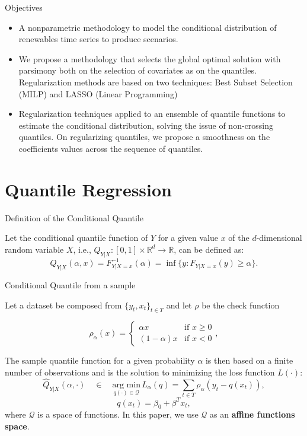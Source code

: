 \begin{frame}{Objectives}

\begin{itemize}
    \item A nonparametric methodology to model the conditional distribution of renewables time series to produce scenarios.
    
    \item We propose a methodology that selects the global optimal solution with parsimony both on the selection of covariates as on the quantiles. Regularization methods are based on two techniques: Best Subset Selection (MILP) and LASSO (Linear Programming) 
    
    \item Regularization techniques applied to an ensemble of quantile functions to estimate the conditional distribution, solving the issue of non-crossing quantiles. On regularizing quantiles, we propose a smoothness on the coefficients values across the sequence of quantiles. 

\end{itemize}

\end{frame}

\section{Quantile Regression}\label{quantile-regression}

\begin{frame}{Definition of the Conditional Quantile}

Let the conditional quantile function of \(Y\) for a given value \(x\)
of the \(d\)-dimensional random variable \(X\), i.e.,
\(Q_{Y|X}:[0,1] \times \mathbb{R}^d \rightarrow \mathbb{R}\), can be
defined as:
\[Q_{Y|X}(\alpha,x) = F_{Y|X=x}^{-1}(\alpha) = \inf\{y: F_{Y|X=x}(y) \geq \alpha\}.\]

\end{frame}

\begin{frame}{Conditional Quantile from a sample}

Let a dataset be composed from \(\{y_t,x_t \}_{t \in T}\) and let
\(\rho\) be the check function

\begin{equation}\label{eq:check-function}
\rho_{\alpha}(x)=\begin{cases}
\alpha x & \text{if }x\geq0\\
(1-\alpha)x & \text{if }x<0
\end{cases},
\end{equation}

The sample quantile function for a given probability \(\alpha\) is then
based on a finite number of observations and is the solution to
minimizing the loss function \(L(\cdot)\): \[
\hat{Q}_{Y|X}(\alpha,\cdot)\quad\in\quad  \underset{q(\cdot)\in\mathcal{Q}}{\text{arg min}}\, L_\alpha(q) = \sum_{t\in T}\rho_{\alpha}(y_{t}-q(x_t)), 
\] \[
q(x_t) = \beta_0 + \beta^T x_t,
\] where \(\mathcal{Q}\) is a space of functions. In this paper, we use
\(\mathcal{Q}\) as an \textbf{affine functions space}.

\end{frame}

